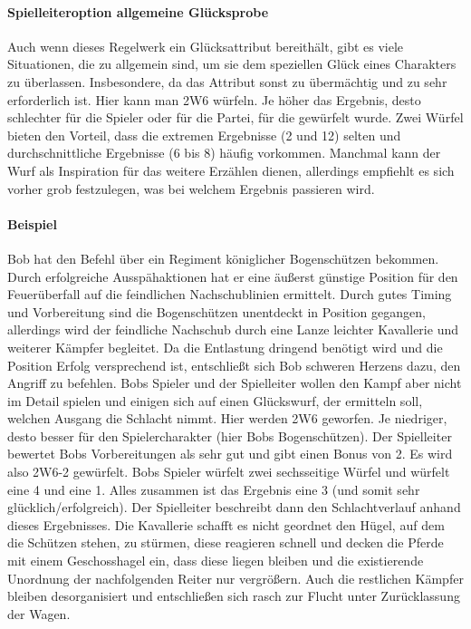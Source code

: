 \documentclass{article}
\begin{document}
\paragraph{Spielleiteroption allgemeine Glücksprobe }

Auch wenn dieses Regelwerk ein Glücksattribut bereithält, gibt es viele Situationen, die zu allgemein sind, um sie dem
speziellen Glück eines Charakters zu überlassen. Insbesondere, da das Attribut sonst zu übermächtig und zu sehr
erforderlich ist. Hier kann man 2W6 würfeln. Je höher das Ergebnis, desto schlechter für die Spieler oder für die
Partei, für die gewürfelt wurde. Zwei Würfel bieten den Vorteil, dass die extremen Ergebnisse (2 und 12) selten und
durchschnittliche Ergebnisse (6 bis 8) häufig vorkommen. Manchmal kann der Wurf als Inspiration für das weitere
Erzählen dienen, allerdings empfiehlt es sich vorher grob festzulegen, was bei welchem Ergebnis passieren wird.

\paragraph{Beispiel}

Bob hat den Befehl über ein Regiment königlicher Bogenschützen bekommen. Durch erfolgreiche Ausspähaktionen hat er eine
äußerst günstige Position für den Feuerüberfall auf die feindlichen Nachschublinien ermittelt. Durch gutes Timing und
Vorbereitung sind die Bogenschützen unentdeckt in Position gegangen, allerdings wird der feindliche Nachschub durch
eine Lanze leichter Kavallerie und weiterer Kämpfer begleitet. Da die Entlastung dringend benötigt wird und die
Position Erfolg versprechend ist, entschließt sich Bob schweren Herzens dazu, den Angriff zu befehlen.
Bobs Spieler und der Spielleiter wollen den Kampf aber nicht im Detail spielen und einigen sich auf einen Glückswurf,
der ermitteln soll, welchen Ausgang die Schlacht nimmt. Hier werden 2W6 geworfen. Je niedriger, desto besser für den
Spielercharakter (hier Bobs Bogenschützen). Der Spielleiter bewertet Bobs Vorbereitungen als sehr gut und gibt einen
Bonus von 2. Es wird also 2W6-2 gewürfelt. Bobs Spieler würfelt zwei sechsseitige Würfel und würfelt eine 4 und eine 1.
Alles zusammen ist das Ergebnis eine 3 (und somit sehr glücklich/erfolgreich). Der Spielleiter beschreibt dann den
Schlachtverlauf anhand dieses Ergebnisses. Die Kavallerie schafft es nicht geordnet den Hügel, auf dem die Schützen
stehen, zu stürmen, diese reagieren schnell und decken die Pferde mit einem Geschosshagel ein, dass diese liegen
bleiben und die existierende Unordnung der nachfolgenden Reiter nur vergrößern. Auch die restlichen Kämpfer bleiben
desorganisiert und entschließen sich rasch zur Flucht unter Zurücklassung der Wagen.
\end{document}
